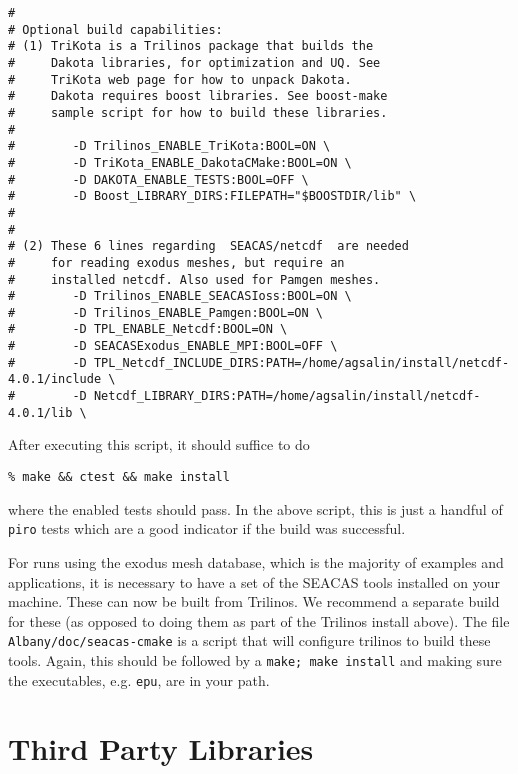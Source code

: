 \documentclass[pdf,12pt,report,strict]{SANDreport}
\theoremstyle{remark}
\begin{document}
\begin{verbatim}
#
# Optional build capabilities:
# (1) TriKota is a Trilinos package that builds the
#     Dakota libraries, for optimization and UQ. See
#     TriKota web page for how to unpack Dakota.
#     Dakota requires boost libraries. See boost-make
#     sample script for how to build these libraries.
#
#        -D Trilinos_ENABLE_TriKota:BOOL=ON \
#        -D TriKota_ENABLE_DakotaCMake:BOOL=ON \
#        -D DAKOTA_ENABLE_TESTS:BOOL=OFF \
#        -D Boost_LIBRARY_DIRS:FILEPATH="$BOOSTDIR/lib" \
#
#
# (2) These 6 lines regarding  SEACAS/netcdf  are needed
#     for reading exodus meshes, but require an
#     installed netcdf. Also used for Pamgen meshes.
#        -D Trilinos_ENABLE_SEACASIoss:BOOL=ON \
#        -D Trilinos_ENABLE_Pamgen:BOOL=ON \
#        -D TPL_ENABLE_Netcdf:BOOL=ON \
#        -D SEACASExodus_ENABLE_MPI:BOOL=OFF \
#        -D TPL_Netcdf_INCLUDE_DIRS:PATH=/home/agsalin/install/netcdf-4.0.1/include \
#        -D Netcdf_LIBRARY_DIRS:PATH=/home/agsalin/install/netcdf-4.0.1/lib \
\end{verbatim}

After executing this script, it should suffice to do
\begin{verbatim}
% make && ctest && make install
\end{verbatim}
where the enabled tests should pass. In the above script, this is
just a handful of \texttt{piro} tests which are a good indicator
if the build was successful.

For runs using the exodus mesh database, which is the majority of
examples and applications, it is necessary to have a set of the
SEACAS tools installed on your machine. These can now be built
from Trilinos. We recommend a separate build for these (as opposed
to doing them as part of the Trilinos install above). The file 
\texttt{Albany/doc/seacas-cmake} is a script that will configure 
trilinos to build these tools.  Again, this should be followed
by a  \texttt{make; make install} and making sure the executables,
e.g. \texttt{epu}, are in your path.


\section{Third Party Libraries}
\end{document}
